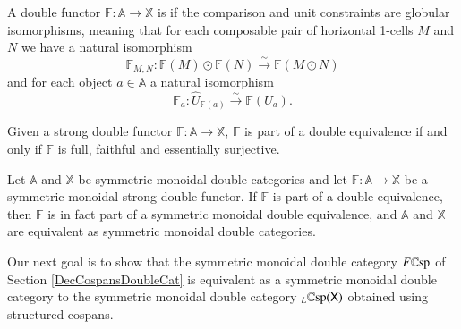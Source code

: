 \documentclass{amsart}
\begin{document}
\begin{defn}
A double functor $\mathbb{F} \colon \mathbb{A} \to \mathbb{X}$ is  if the comparison and unit constraints are globular isomorphisms, meaning that for each composable pair of horizontal 1-cells $M$ and $N$ we have a natural isomorphism $$\mathbb{F}_{M,N} \colon \mathbb{F}(M) \odot \mathbb{F}(N) \xrightarrow{\sim} \mathbb{F}(M \odot N)$$and for each object $a \in \mathbb{A}$ a natural isomorphism $$\mathbb{F}_a \colon \hat{U}_{\mathbb{F}(a)} \xrightarrow{\sim} \mathbb{F}(U_a).$$
\end{defn}
\begin{thm}[Shulman,7.8]\label{ShulDubEquiv}
Given a strong double functor $\mathbb{F} \colon \mathbb{A} \to \mathbb{X}$, $\mathbb{F}$ is part of a double equivalence if and only if $\mathbb{F}$ is full, faithful and essentially surjective.
\end{thm}

\begin{prop}
Let $\mathbb{A}$ and $\mathbb{X}$ be symmetric monoidal double categories and let $\mathbb{F} \colon \mathbb{A} \to \mathbb{X}$ be a symmetric monoidal strong double functor. If $\mathbb{F}$ is part of a double equivalence, then $\mathbb{F}$ is in fact part of a symmetric monoidal double equivalence, and $\mathbb{A}$ and $\mathbb{X}$ are equivalent as symmetric monoidal double categories.
\end{prop}

Our next goal is to show that the symmetric monoidal double category $F\mathbb{C}\textnormal{sp}$ of Section \ref{DecCospansDoubleCat} is equivalent as a symmetric monoidal double category to the symmetric monoidal double category $_L \mathbb{C}\textnormal{sp}(\mathsf{X})$ obtained using structured cospans.
\end{document}
